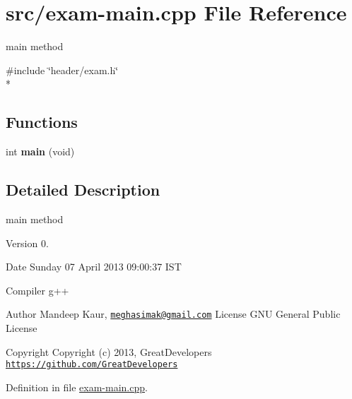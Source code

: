 \hypertarget{exam-main_8cpp}{\section{src/exam-\/main.cpp File Reference}
\label{exam-main_8cpp}
}


main method  


{\ttfamily \#include \char`\"{}header/exam.\-h\char`\"{}}\\*
\subsection*{Functions}
\begin{DoxyCompactItemize}
\item 
\hypertarget{exam-main_8cpp_a840291bc02cba5474a4cb46a9b9566fe}{int {\bfseries main} (void)}\label{exam-main_8cpp_a840291bc02cba5474a4cb46a9b9566fe}

\end{DoxyCompactItemize}


\subsection{Detailed Description}
main method \begin{DoxyVersion}{Version}
0. 
\end{DoxyVersion}
\begin{DoxyDate}{Date}
Sunday 07 April 2013 09\-:00\-:37 I\-S\-T\par
 Compiler g++
\end{DoxyDate}
\begin{DoxyAuthor}{Author}
Mandeep Kaur, \href{mailto:meghasimak@gmail.com}{\tt meghasimak@gmail.\-com} License G\-N\-U General Public License 
\end{DoxyAuthor}
\begin{DoxyCopyright}{Copyright}
Copyright (c) 2013, Great\-Developers \href{https://github.com/GreatDevelopers}{\tt https\-://github.\-com/\-Great\-Developers} 
\end{DoxyCopyright}


Definition in file \hyperlink{exam-main_8cpp_source}{exam-\/main.\-cpp}.


